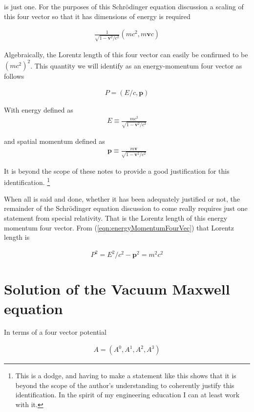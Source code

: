 \documentclass[]{eliblog}
\newcommand{\Bp}[0]{\mathbf{p}}
\newcommand{\Bv}[0]{\mathbf{v}}
\begin{document}
is just one.  For the purposes of this 
Schr\"{o}dinger equation
discussion a scaling of this four vector so that it has dimensions of energy is required

\begin{align}
\frac{1}{\sqrt{1 - \Bv^2/c^2}}(m c^2, m\Bv c)
\end{align}

Algebraically, the Lorentz length of this four vector can easily be confirmed to be $(m c^2)^2$.  This quantity 
we will identify as an energy-momentum four vector as follows

\begin{align}\label{eqn:energyMomentumFourVec}
P = (E/c, \Bp)
\end{align}

With energy defined as
\begin{align}
E \equiv \frac{m c^2}{\sqrt{1 - \Bv^2/c^2}}
\end{align}

and spatial momentum defined as
\begin{align}
\Bp \equiv \frac{m \Bv}{\sqrt{1 - \Bv^2/c^2}}
\end{align}

It is beyond the scope of these notes to provide a good justification for this identification.
\footnote{This is a dodge, and having to make a statement like this shows that it is beyond the scope of the author's understanding to coherently justify this identification.  In the spirit of my engineering education I can at least work with it.}

When all is said and done, whether it has been adequately justified or not, the remainder
of the 
Schr\"{o}dinger equation
discussion to come really requires just one statement from special relativity.  That is
the Lorentz length of this energy momentum four vector.
From (\ref{eqn:energyMomentumFourVec}) that Lorentz length is

\begin{align}
P^2 = E^2/c^2 - \Bp^2 = m^2 c^2
\end{align}

\section{Solution of the Vacuum Maxwell equation}

In terms of a four vector potential

\begin{align}
A = (A^0, A^1, A^2, A^3)
\end{align}
\end{document}
